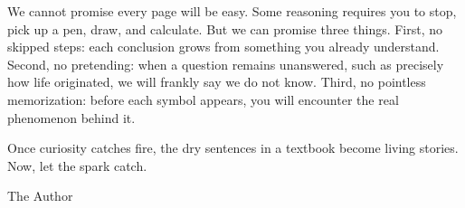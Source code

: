 We cannot promise every page will be easy. Some reasoning requires you to stop, pick up a pen, draw, and calculate. But we can promise three things. First, no skipped steps: each conclusion grows from something you already understand. Second, no pretending: when a question remains unanswered, such as precisely how life originated, we will frankly say we do not know. Third, no pointless memorization: before each symbol appears, you will encounter the real phenomenon behind it.

Once curiosity catches fire, the dry sentences in a textbook become living stories. Now, let the spark catch.

\hfill The Author
